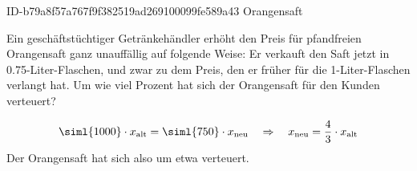 \begin{exercise}
      {ID-b79a8f57a767f9f382519ad269100099fe589a43}
      {Orangensaft}
  \ifproblem\problem\par
    Ein geschäftstüchtiger Getränkehändler erhöht den Preis für pfandfreien
    Orangensaft \glqq ganz unauffällig\grqq{} auf folgende Weise: Er verkauft
    den Saft jetzt in \num{0.75}-Liter-Flaschen, und zwar zu dem Preis, den er
    früher für die 1-Liter-Flaschen verlangt hat. Um wie viel Prozent
    hat sich der Orangensaft für den Kunden verteuert?
  \fi
  \ifoutcome\outcome\par
    \begin{equation*}
      \text{\siml{1000}}\cdot x_{\text{alt}}=\text{\siml{750}}\cdot x_{\text{neu}}
      \quad\Rightarrow\quad
      x_{\text{neu}}=\frac{4}{3}\cdot x_{\text{alt}}
    \end{equation*}
    Der Orangensaft hat sich also um etwa  verteuert.
  \fi
\end{exercise}
